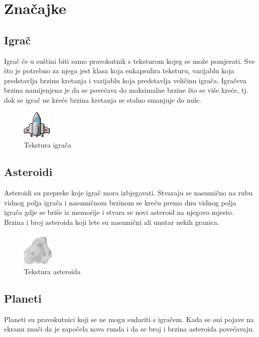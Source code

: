 \documentclass{mathos}
\begin{document}
\section{Značajke}
\subsection{Igrač}
Igrač će u suštini biti samo pravokutnik s teksturom kojeg se može pomjerati. Sve što je potrebno za njega jest klasa koja enkapsulira teksturu, varijablu koja predstavlja
brzinu kretanja i varijablu koja predstavlja veličinu igrača. Igračeva brzina namijenjena je da se povećava do maksimalne brzine što se više kreće, tj. dok
se igrač ne kreće brzina kretanja se stalno smanjuje do nule.

\begin{figure}[H]
    \centering
    \includegraphics[scale=0.75]{Slike/ship.png}
    \caption{Tekstura igrača}
    \label{im_ship}
\end{figure}

\subsection{Asteroidi}
Asteroidi su prepreke koje igrač mora izbjegavati. Stvaraju se nasumično na rubu vidnog polja igrača i nasumičnom brzinom se kreću prema dnu vidnog polja igrača gdje se briše iz
memorije i stvara se novi asteroid na njegovo mjesto. Brzina i broj asteroida koji lete su nasumični ali unutar nekih granica.

\begin{figure}[H]
    \centering
    \includegraphics[scale=0.5]{Slike/GreyAsteroid.png}
    \caption{Tekstura asteroida}
    \label{im_asteroid}
\end{figure}

\subsection{Planeti}
Planeti su pravokutnici koji se ne mogu sudariti s igračem. Kada se oni pojave na ekranu znači da je započela nova runda i da se broj i brzina asteroida povećavaju.
\end{document}
